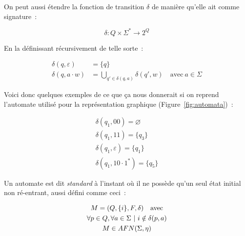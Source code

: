 

\vphantom{}

On peut aussi étendre la fonction de transition \(\delta\) de manière qu'elle
ait comme signature~:

\[
    \delta: Q \times \Sigma^* \to 2^Q
\]

En la définissant récursivement de telle sorte~:

\begin{align*}
    \delta(q, \varepsilon) & = \{q\}                                                                       \\
    \delta(q, a \cdot w)   & = \bigcup_{q' \in \delta(q, a)} \delta(q', w) \quad \text{avec}~ a \in \Sigma
\end{align*}

\begin{example}
    Voici donc quelques exemples de ce que ça nous donnerait si on reprend
    l'automate utilisé pour la représentation graphique
    (Figure~\ref{fig:automata})~:

    \begin{gather*}
        \delta(q_1, 00) = \varnothing \\
        \delta(q_1, 11) = \{q_3\} \\
        \delta(q_1, \varepsilon) = \{q_1\} \\
        \delta(q_1, 10 \cdot 1^*) = \{q_5\}
    \end{gather*}
\end{example}

\vphantom{}

\begin{definition}
    Un automate est dit \textit{standard} à l'instant où il ne possède qu'un seul
    état initial non ré-entrant, aussi défini comme ceci~:

    \begin{gather*}
        M = (Q, \{i\}, F, \delta) \quad \text{avec} \\
        \forall p \in Q, \forall a \in \Sigma ~|~ i \notin \delta(p, a) \notag \\
        M \in AFN(\Sigma, \eta) \notag
    \end{gather*}
\end{definition}

